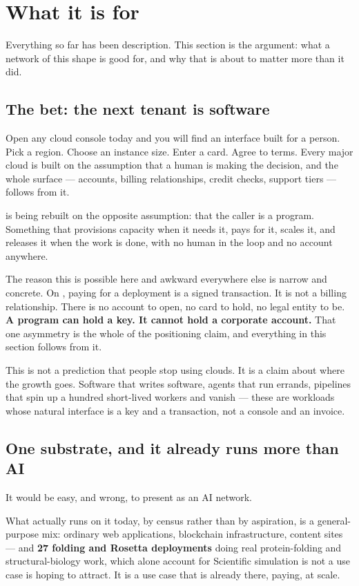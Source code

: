 \section{What it is for}
\label{sec:short:whatfor}

Everything so far has been description. This section is the argument: what a network of this shape
is good for, and why that is about to matter more than it did.

\subsection{The bet: the next tenant is software}

Open any cloud console today and you will find an interface built for a person. Pick a region. Choose
an instance size. Enter a card. Agree to terms. Every major cloud is built on the assumption that a
human is making the decision, and the whole surface --- accounts, billing relationships, credit
checks, support tiers --- follows from it.

\Flux{} is being rebuilt on the opposite assumption: that the caller is a program. Something that
provisions capacity when it needs it, pays for it, scales it, and releases it when the work is done,
with no human in the loop and no account anywhere.

The reason this is possible here and awkward everywhere else is narrow and concrete. On \Flux{},
paying for a deployment is a signed transaction. It is not a billing relationship. There is no
account to open, no card to hold, no legal entity to be. \textbf{A program can hold a key. It cannot
hold a corporate account.} That one asymmetry is the whole of the positioning claim, and everything
in this section follows from it.

This is not a prediction that people stop using clouds. It is a claim about where the growth goes.
Software that writes software, agents that run errands, pipelines that spin up a hundred short-lived
workers and vanish --- these are workloads whose natural interface is a key and a transaction, not a
console and an invoice.

\subsection{One substrate, and it already runs more than AI}

It would be easy, and wrong, to present \Flux{} as an AI network.

What actually runs on it today, by census rather than by aspiration, is a general-purpose mix:
ordinary web applications, blockchain infrastructure, content sites --- and \textbf{27 folding and
Rosetta deployments} doing real protein-folding and structural-biology work, which alone account for
 Scientific simulation is not a use case \Flux{} is
hoping to attract. It is a use case that is already there, paying, at scale.

